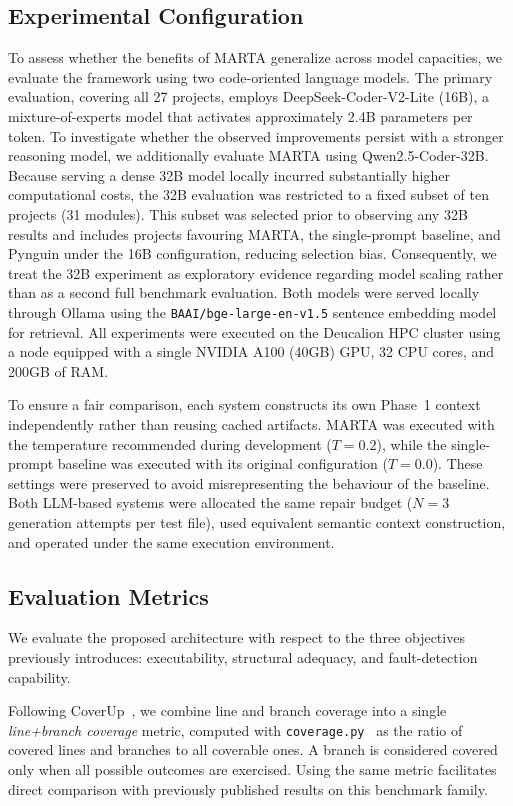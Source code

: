 \documentclass{llncs}
\begin{document}
\subsection{Experimental Configuration}

To assess whether the benefits of MARTA generalize across model capacities, we evaluate the framework using two code-oriented language models. The primary evaluation, covering all 27 projects, employs DeepSeek-Coder-V2-Lite (16B), a mixture-of-experts model that activates approximately 2.4B parameters per token. To investigate whether the observed improvements persist with a stronger reasoning model, we additionally evaluate MARTA using Qwen2.5-Coder-32B.
%
Because serving a dense 32B model locally incurred substantially higher computational costs, the 32B evaluation was restricted to a fixed subset of ten projects (31 modules). This subset was selected prior to observing any 32B results and includes projects favouring MARTA, the single-prompt baseline, and Pynguin under the 16B configuration, reducing selection bias. Consequently, we treat the 32B experiment as exploratory evidence regarding model scaling rather than as a second full benchmark evaluation.
%
Both models were served locally through Ollama using the \texttt{BAAI/bge-large-en-v1.5} sentence embedding model for retrieval. All experiments were executed on the Deucalion HPC cluster using a node equipped with a single NVIDIA A100 (40GB) GPU, 32 CPU cores, and 200GB of RAM.

To ensure a fair comparison, each system constructs its own Phase~1 context independently rather than reusing cached artifacts. MARTA was executed with the temperature recommended during development ($T=0.2$), while the single-prompt baseline was executed with its original configuration ($T=0.0$). These settings were preserved to avoid misrepresenting the behaviour of the baseline. Both LLM-based systems were allocated the same repair budget ($N=3$ generation attempts per test file), used equivalent semantic context construction, and operated under the same execution environment.

\subsection{Evaluation Metrics}
We evaluate the proposed architecture with respect to the three objectives previously introduces: executability, structural adequacy, and fault-detection capability.

Following CoverUp~\cite{altmayer2025coverup}, we combine line and branch coverage into a single \emph{line+branch coverage} metric, computed with \texttt{coverage.py}~\cite{coveragepy} as the ratio of covered lines and branches to all coverable ones. A branch is considered covered only when all possible outcomes are exercised. Using the same metric facilitates direct comparison with previously published results on this benchmark family.
\end{document}
